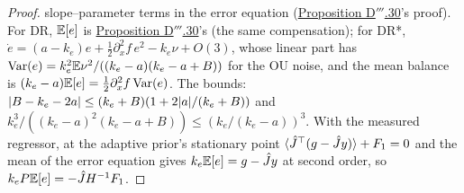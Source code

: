 \begin{proof}
slope--parameter terms in the error equation (\hyperref[res:thmDppp:30]{Proposition D$'''$.30}'s proof). For DR,
$\mathbb{E}[e]$ is \hyperref[res:thmDppp:30]{Proposition D$'''$.30}'s (the same compensation); for DR*,
$\dot e = (a - k_e)e + \frac12\partial^2_xf\,e^2 - k_e\nu + O(3)$, whose linear part has
$\operatorname{Var}(e) = k_e^2\mathbb{E}\nu^2/((k_e - a)(k_e - a + B))$ for the OU noise, and the mean balance is
$(k_e - a)\mathbb{E}[e] = \frac12\partial^2_xf\operatorname{Var}(e)$. The bounds:
$\lvert B - k_e - 2a\rvert\le(k_e + B)(1 + 2\lvert a\rvert/(k_e + B))$ and
$k_e^3/((k_e - a)^2(k_e - a + B))\le(k_e/(k_e - a))^3$. With the measured regressor, at the adaptive prior's
stationary point $\langle\hat J^\top(g - \hat Jy)\rangle + F_1 = 0$ and the mean of the error equation gives
$k_e\mathbb{E}[e] = g - \hat Jy$ at second order, so $k_eP\mathbb{E}[e] = -\hat JH^{-1}F_1$.
\end{proof}

